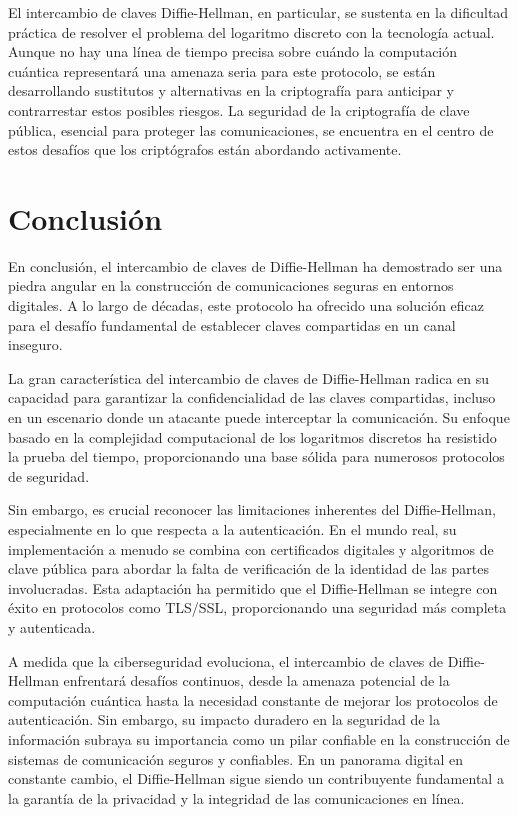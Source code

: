 \documentclass[11pt]{article}
\begin{document}
El intercambio de claves Diffie-Hellman, en particular, se sustenta en la dificultad práctica de resolver el problema del logaritmo discreto con la tecnología actual. Aunque no hay una línea de tiempo precisa sobre cuándo la computación cuántica representará una amenaza seria para este protocolo, se están desarrollando sustitutos y alternativas en la criptografía para anticipar y contrarrestar estos posibles riesgos. La seguridad de la criptografía de clave pública, esencial para proteger las comunicaciones, se encuentra en el centro de estos desafíos que los criptógrafos están abordando activamente.

\section{Conclusión}
En conclusión, el intercambio de claves de Diffie-Hellman ha demostrado ser una piedra angular en la construcción de comunicaciones seguras en entornos digitales. A lo largo de décadas, este protocolo ha ofrecido una solución eficaz para el desafío fundamental de establecer claves compartidas en un canal inseguro.

La gran característica del intercambio de claves de Diffie-Hellman radica en su capacidad para garantizar la confidencialidad de las claves compartidas, incluso en un escenario donde un atacante puede interceptar la comunicación. Su enfoque basado en la complejidad computacional de los logaritmos discretos ha resistido la prueba del tiempo, proporcionando una base sólida para numerosos protocolos de seguridad.

Sin embargo, es crucial reconocer las limitaciones inherentes del Diffie-Hellman, especialmente en lo que respecta a la autenticación. En el mundo real, su implementación a menudo se combina con certificados digitales y algoritmos de clave pública para abordar la falta de verificación de la identidad de las partes involucradas. Esta adaptación ha permitido que el Diffie-Hellman se integre con éxito en protocolos como TLS/SSL, proporcionando una seguridad más completa y autenticada.

A medida que la ciberseguridad evoluciona, el intercambio de claves de Diffie-Hellman enfrentará desafíos continuos, desde la amenaza potencial de la computación cuántica hasta la necesidad constante de mejorar los protocolos de autenticación. Sin embargo, su impacto duradero en la seguridad de la información subraya su importancia como un pilar confiable en la construcción de sistemas de comunicación seguros y confiables. En un panorama digital en constante cambio, el Diffie-Hellman sigue siendo un contribuyente fundamental a la garantía de la privacidad y la integridad de las comunicaciones en línea.
\end{document}
